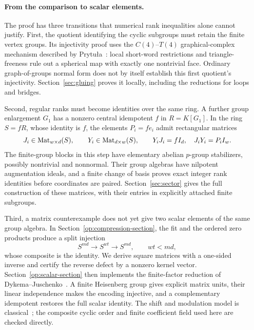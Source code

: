\paragraph{From the comparison to scalar elements.}
The proof has three transitions that numerical rank inequalities alone
cannot justify. First, the quotient identifying the cyclic subgroups must
retain the finite vertex groups. Its injectivity proof uses the
$C(4)$--$T(4)$ graphical-complex mechanism described by
Prytu\l a~\cite[Section~8]{Prytula2024}: local short-word restrictions and
triangle-freeness rule out a spherical map with exactly one nontrivial
face. Ordinary graph-of-groups normal form does not by itself establish
this first quotient's injectivity. Section~\ref{sec:gluing} proves it
locally, including the reductions for loops and bridges.

Second, regular ranks must become identities over the same ring. A
further group enlargement $G_1$ has a nonzero central idempotent $f$ in
$R=K[G_1]$. In the ring $S=fR$, whose identity is $f$, the elements
$P_i=fe_i$ admit rectangular matrices
\[
 J_i\in\operatorname{Mat}_{w\times d}(S),\qquad
 Y_i\in\operatorname{Mat}_{d\times w}(S),\qquad
 Y_iJ_i=fI_d,\quad J_iY_i=P_iI_w.
\]
The finite-group blocks in this step have elementary abelian $p$-group
stabilizers, possibly nontrivial and nonnormal. Their group algebras have
nilpotent augmentation ideals, and a finite
change of basis proves exact integer rank identities before coordinates
are paired. Section~\ref{sec:sector} gives the full construction of these
matrices, with their entries in explicitly attached finite subgroups.

Third, a matrix counterexample does not yet give two scalar elements of
the same group algebra. In Section~\ref{op:compression-section}, the
fit and the ordered zero products produce a split injection
\[
 S^{md}\longrightarrow S^{wt}\longrightarrow S^{md},
 \qquad wt<md,
\]
whose composite is the identity. We derive square matrices with a
one-sided inverse and certify the reverse defect by a nonzero kernel
vector. Section~\ref{op:scalar-section} then implements the finite-factor
reduction of Dykema--Juschenko~\cite[Lemma~2.1 and Theorem~2.2]{DykemaJuschenko2015}.
A finite Heisenberg group gives explicit matrix units, their linear
independence makes the encoding injective, and a complementary idempotent
restores the full scalar identity. The shift and modulation model is
classical~\cite[Section~1.2]{GurevichHadani2009}; the composite cyclic
order and finite coefficient field used here are checked directly.

